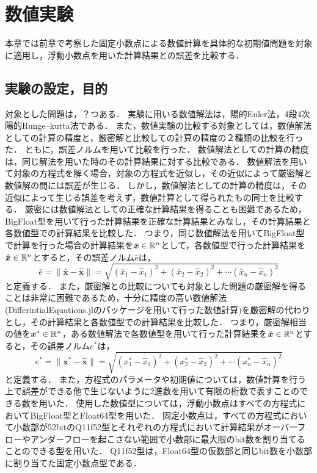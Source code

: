 \chapter{数値実験}
\label{chap:数値実験}
本章では前章で考察した固定小数点による数値計算を具体的な初期値問題を対象に適用し，浮動小数点を用いた計算結果との誤差を比較する．
\section{実験の設定，目的}
対象とした問題は，？つある．
実験に用いる数値解法は，陽的Euler法，4段4次陽的Runge--kutta法である．
また，数値実験の比較する対象としては，数値解法としての計算の精度と，厳密解と比較しての計算の精度の２種類の比較を行った．
ともに，誤差ノルムを用いて比較を行った．
数値解法としての計算の精度は，同じ解法を用いた時のその計算結果に対する比較である．
数値解法を用いて対象の方程式を解く場合，対象の方程式を近似し，その近似によって厳密解と数値解の間には誤差が生じる．
しかし，数値解法としての計算の精度は，その近似によって生じる誤差を考えず，数値計算として得られたもの同士を比較する．
厳密には数値解法としての正確な計算結果を得ることも困難であるため，BigFloat型を用いて行った計算結果を正確な計算結果とみなし，その計算結果と各数値型での計算結果を比較した．
つまり，同じ数値解法を用いてBigFloat型で計算を行った場合の計算結果を$\bar{\bm{x}} \in \mathbb{R}^n$として，各数値型で行った計算結果を$\hat{\bm{x}} \in \mathbb{R}^n$とすると，その誤差ノルム$\bar{e}$は，
\begin{equation}
    \bar{e} = \|\bar{\bm{x}} - \hat{\bm{x}}\| = \sqrt{(\bar{x}_1 - \hat{x}_1)^2 + (\bar{x}_2 - \hat{x}_2)^2 + \cdots (\bar{x}_n - \hat{x}_n)^2}
\end{equation}
と定義する．
また，厳密解との比較についても対象とした問題の厳密解を得ることは非常に困難であるため，十分に精度の高い数値解法(DifferintialEquations.jlのパッケージを用いて行った数値計算)を厳密解の代わりとし，その計算結果と各数値型での計算結果を比較した．
つまり，厳密解相当の値を$\bm{x}^{\ast} \in \mathbb{R}^n$，ある数値解法で各数値型を用いて行った計算結果を$\hat{\bm{x}} \in \mathbb{R}^n$とすると，その誤差ノルム$e^{\ast}$は，
\begin{equation}
   e^{\ast} = \|\bm{x}^{\ast} - \hat{\bm{x}}\| = \sqrt{(x_1^{\ast} - \hat{x}_1)^2 + (x_2^{\ast} - \hat{x}_2)^2 + \cdots (x_n^{\ast} - \hat{x}_n)^2}
\end{equation}
と定義する．
また，方程式のパラメータや初期値については，数値計算を行う上で誤差ができる他で生じないように2進数を用いて有限の桁数で表すことのできる数を用いた．
使用した数値型については，浮動小数点はすべての方程式においてBigFloat型とFloat64型を用いた．
固定小数点は，すべての方程式において小数部が52bitのQ11f52型とそれぞれの方程式において計算結果がオーバーフローやアンダーフローを起こさない範囲で小数部に最大限のbit数を割り当てることのできる型を用いた．
Q11f52型は，Float64型の仮数部と同じbit数を小数部に割り当てた固定小数点型である．

